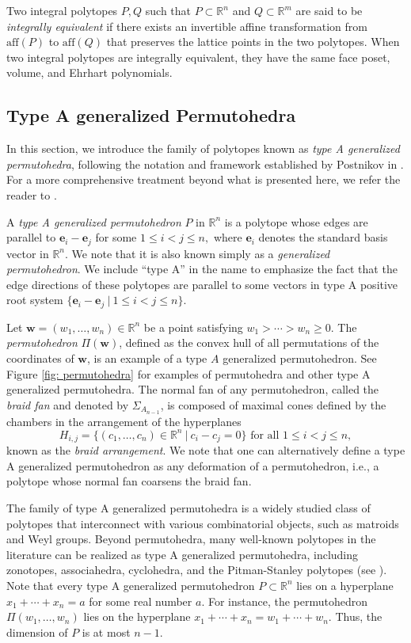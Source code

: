 \documentclass[12pt,reqno]{article}%
\theoremstyle{definition}
\numberwithin{equation}{section}
\newcommand{\bbe}{\mathbf{e}}
\newcommand{\bbw}{\mathbf{w}}
\newcommand{\R}{\mathbb R}
\begin{document}
Two integral polytopes $P, Q$ such that $P \subset \R^n$ and $Q \subset \R^m$ are said to be \emph{integrally equivalent} if there exists an invertible affine transformation from $\mathrm{aff}(P)$ to $\mathrm{aff}(Q)$ that preserves the lattice points in the two polytopes. When two integral polytopes are integrally equivalent, they have the same face poset, volume, and Ehrhart polynomials.
 

\subsection{Type A generalized Permutohedra}

In this section, we introduce the family of polytopes known as \emph{type A generalized permutohedra}, following the notation and framework established by Postnikov in \cite{Postnikov2005}. For a more comprehensive treatment beyond what is presented here, we refer the reader to \cite{Postnikov2005}.



A \emph{type A generalized permutohedron} $P$ in $\R^n$ is a polytope whose edges are parallel to $\bbe_i - \bbe_j$ for some $1 \leq i < j \leq n,$ where $\bbe_i$ denotes the standard basis vector in $\R^n.$ We note that it is also known simply as a \emph{generalized permutohedron}. We include ``type A'' in the name to emphasize the fact that the edge directions of these polytopes are parallel to some vectors in type A positive root system $\{\bbe_i - \bbe_j\ | \ 1 \leq i < j \leq n\}$. 

Let $\bbw = (w_1, \dots, w_n) \in \R^n$ be a point satisfying $w_1 > \cdots > w_n \geq 0.$ The \emph{permutohedron} $\Pi(\bbw)$, defined as the convex hull of all permutations of the coordinates of $\bbw$, is an example of a type $A$ generalized permutohedron. See Figure \ref{fig: permutohedra} for examples of permutohedra and other type A generalized permutohedra. The normal fan of any permutohedron, called the \emph{braid fan} and denoted by $\Sigma_{A_{n-1}}$, is composed of maximal cones defined by the chambers in the arrangement of the hyperplanes
\[H_{i,j} = \{(c_1,\dots, c_n) \in \R^n \ |\ c_i - c_j = 0\} \text{ for all } 1 \leq i < j \leq n,\]
known as the \emph{braid arrangement}. We note that one can alternatively define a type A generalized permutohedron as any deformation of a permutohedron, i.e., a polytope whose normal fan coarsens the braid fan. 

The family of type A generalized permutohedra is a widely studied class of polytopes that interconnect with various combinatorial objects, such as matroids and Weyl groups. Beyond permutohedra, many well-known polytopes in the literature can be realized as type A generalized permutohedra, including zonotopes, associahedra, cyclohedra, and the Pitman-Stanley polytopes (see \cite[Section 8]{Postnikov2005}). Note that every type A generalized permutohedron $P \subset \R^n$ lies on a hyperplane $x_1+ \cdots + x_n = a$ for some real number $a.$ For instance, the permutohedron $\Pi(w_1, \dots, w_n)$ lies on the hyperplane $x_1 + \cdots + x_n = w_1 + \cdots + w_n.$ Thus, the dimension of $P$ is at most $n-1.$ 
\end{document}
